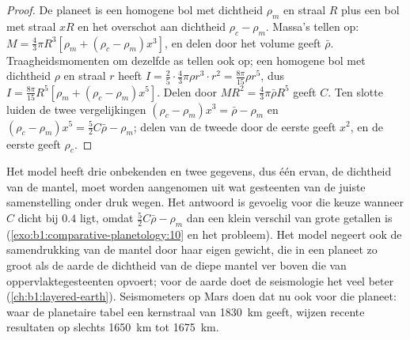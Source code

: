 \begin{proof}
De planeet is een homogene bol met dichtheid $\rho_m$ en straal $R$ plus een bol met straal $xR$ en
het overschot aan dichtheid $\rho_c - \rho_m$. Massa's tellen op:
$M = \tfrac43\pi R^3[\rho_m + (\rho_c - \rho_m)x^3]$, en delen door het volume geeft $\bar\rho$.
Traagheidsmomenten om dezelfde as tellen ook op; een homogene bol met dichtheid $\rho$ en straal $r$ heeft
$I = \tfrac25\cdot\tfrac43\pi\rho r^3\cdot r^2 = \tfrac{8\pi}{15}\rho r^5$, dus
$I = \tfrac{8\pi}{15}R^5[\rho_m + (\rho_c - \rho_m)x^5]$. Delen door
$MR^2 = \tfrac43\pi\bar\rho R^5$ geeft $C$. Ten slotte luiden de twee vergelijkingen
$(\rho_c - \rho_m)x^3 = \bar\rho - \rho_m$ en $(\rho_c - \rho_m)x^5 =
\tfrac52C\bar\rho - \rho_m$; delen van de tweede door de eerste geeft $x^2$, en de eerste
geeft $\rho_c$.
\end{proof}

Het model heeft drie onbekenden en twee gegevens, dus één ervan, de dichtheid van de mantel, moet
worden aangenomen uit wat gesteenten van de juiste samenstelling onder druk wegen. Het antwoord is
gevoelig voor die keuze wanneer $C$ dicht bij $0.4$ ligt, omdat $\tfrac52C\bar\rho - \rho_m$ dan een
klein verschil van grote getallen is (\cref{exo:b1:comparative-planetology:10} en het probleem). Het
model negeert ook de samendrukking van de mantel door haar eigen gewicht, die in een planeet zo groot
als de aarde de dichtheid van de diepe mantel ver boven die van oppervlaktegesteenten opvoert; voor
de aarde doet de seismologie het veel beter (\cref{ch:b1:layered-earth}). Seismometers op Mars doen
dat nu ook voor die planeet: waar de planetaire tabel een kernstraal van \qty{1830}{km}
geeft, wijzen recente resultaten op slechts \qty{1650}{km} tot \qty{1675}{km}.

